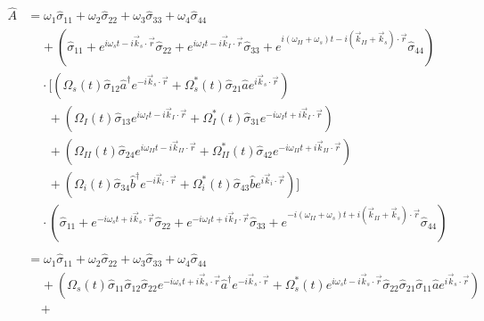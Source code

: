 \documentclass[aps,pra,showpacs,amsmath,amssymb,nofootinbib,longbibliography,superscriptaddress
]{revtex4-1}
\theoremstyle{definition}
\theoremstyle{remark}
\newcommand{\0}{\hat{0}}
\begin{document}
\begin{align}
    \hat{A}
    &=
    \omega_1 \hat{\sigma}_{11} + \omega_2 \hat{\sigma}_{22} + \omega_3 \hat{\sigma}_{33} + \omega_4 \hat{\sigma}_{44} \nonumber \\
    &\;\;\;\;+ \left(\hat{\sigma}_{11} + e^{i \omega_s t - i \vec{k}_s \cdot \vec{r}} \hat{\sigma}_{22} + e^{i \omega_I t - i \vec{k}_I \cdot \vec{r}} \hat{\sigma}_{33} + e^{i(\omega_{II} + \omega_s) t - i(\vec{k}_{II} + \vec{k}_s) \cdot \vec{r}} \hat{\sigma}_{44}\right) \nonumber\\
    &\;\;\;\;\cdot \biggl[
        \left(\Omega_{s}(t) \hat{\sigma}_{12} \hat{a}^{\dagger} e^{-i \vec{k}_{s} \cdot \vec{r}} + \Omega_{s}^*(t) \hat{\sigma}_{21} \hat{a} e^{i \vec{k}_{s} \cdot \vec{r}}\right)\nonumber \\
        &\;\;\;\;\;\;+ \left(\Omega_{I}(t) \hat{\sigma}_{13} e^{i \omega_I t - i \vec{k}_I \cdot \vec{r}} + \Omega_{I}^*(t) \hat{\sigma}_{31} e^{-i \omega_I t + i \vec{k}_I \cdot \vec{r}}\right)\nonumber \\
        &\;\;\;\;\;\;+ \left(\Omega_{II}(t) \hat{\sigma}_{24} e^{i \omega_{II} t - i \vec{k}_{II} \cdot \vec{r}} + \Omega_{II}^*(t) \hat{\sigma}_{42} e^{-i \omega_{II} t + i \vec{k}_{II} \cdot \vec{r}}\right)\nonumber \\
        &\;\;\;\;\;\;+ \left(\Omega_{i}(t) \hat{\sigma}_{34} \hat{b}^{\dagger} e^{-i \vec{k}_{i} \cdot \vec{r}} + \Omega_{i}^*(t) \hat{\sigma}_{43} \hat{b} e^{i \vec{k}_{i} \cdot \vec{r}}\right)
    \biggr] \nonumber \\
    &\;\;\;\; \cdot \left(\hat{\sigma}_{11} + e^{-i \omega_s t + i \vec{k}_s \cdot \vec{r}} \hat{\sigma}_{22} + e^{-i \omega_I t + i \vec{k}_I \cdot \vec{r}} \hat{\sigma}_{33} + e^{-i(\omega_{II} + \omega_s) t + i(\vec{k}_{II} + \vec{k}_s) \cdot \vec{r}} \hat{\sigma}_{44}\right)\nonumber \\ \nonumber\\
    &=
    \omega_1 \hat{\sigma}_{11} + \omega_2 \hat{\sigma}_{22} + \omega_3 \hat{\sigma}_{33} + \omega_4 \hat{\sigma}_{44} \nonumber \\
    &\;\;\;\;+
    \left(
        \Omega_{s}(t) \hat{\sigma}_{11} \hat{\sigma}_{12} \hat{\sigma}_{22} e^{-i \omega_s t + i \vec{k}_s \cdot \vec{r}} \hat{a}^{\dagger} e^{-i \vec{k}_{s} \cdot \vec{r}} +
        \Omega_{s}^*(t) e^{i \omega_s t - i \vec{k}_s \cdot \vec{r}} \hat{\sigma}_{22} \hat{\sigma}_{21} \hat{\sigma}_{11} \hat{a} e^{i \vec{k}_{s} \cdot \vec{r}}
    \right)\nonumber \\
    &\;\;\;\;+

\end{align}
\end{document}
